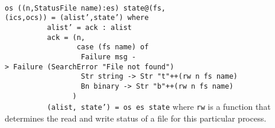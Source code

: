\mbox{\tt }\\[-8pt]
\mbox{\tt os\ ((n,StatusFile\ name):es)\ state@(fs,(ics,ocs))\ =\ (alist',state')\ where}\\
\mbox{\tt \ \ \ \ \ \ \ \ \ \ alist'\ =\ ack\ :\ alist}\\
\mbox{\tt \ \ \ \ \ \ \ \ \ \ ack\ =\ (n,}\\
\mbox{\tt \ \ \ \ \ \ \ \ \ \ \ \ \ \ \ \ \ case\ (fs\ name)\ of}\\
\mbox{\tt \ \ \ \ \ \ \ \ \ \ \ \ \ \ \ \ \ \ Failure\ msg\ ->\ Failure\ (SearchError\ "File\ not\ found")}\\
\mbox{\tt \ \ \ \ \ \ \ \ \ \ \ \ \ \ \ \ \ \ Str\ string\ ->\ Str\ "t"++(rw\ n\ fs\ name)}\\
\mbox{\tt \ \ \ \ \ \ \ \ \ \ \ \ \ \ \ \ \ \ Bn\ binary\ ->\ Str\ "b"++(rw\ n\ fs\ name)}\\
\mbox{\tt \ \ \ \ \ \ \ \ \ \ \ \ \ \ \ \ )}\\
\mbox{\tt \ \ \ \ \ \ \ \ \ \ (alist,\ state')\ =\ os\ es\ state}
\eprog
where \mbox{\tt rw} is a function that determines the read and write status
of a file for this particular process.

